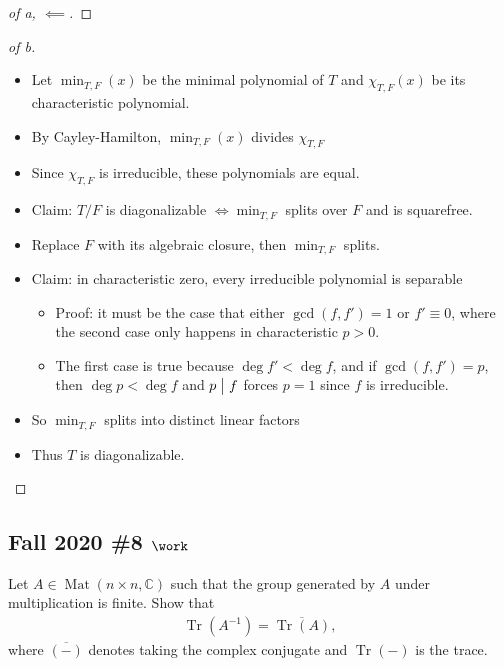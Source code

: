 \begin{solution}
\begin{proof}[of a, $\impliedby$]
\end{proof}

\begin{proof}[of b]

\envlist

\begin{itemize}
\tightlist
\item
  Let \(\min_{T, F}(x)\) be the minimal polynomial of \(T\) and
  \(\chi_{T, F}(x)\) be its characteristic polynomial.
\item
  By Cayley-Hamilton, \(\min_{T, F}(x)\) divides \(\chi_{T, F}\)
\item
  Since \(\chi_{T, F}\) is irreducible, these polynomials are equal.
\item
  Claim: \(T/F\) is diagonalizable \(\iff \min_{T, F}\) splits over
  \(F\) and is squarefree.
\item
  Replace \(F\) with its algebraic closure, then \(\min_{T, F}\) splits.
\item
  Claim: in characteristic zero, every irreducible polynomial is
  separable

  \begin{itemize}
  \tightlist
  \item
    Proof: it must be the case that either \(\gcd(f, f') = 1\) or
    \(f' \equiv 0\), where the second case only happens in
    characteristic \(p>0\).
  \item
    The first case is true because \(\deg f' < \deg f\), and if
    \(\gcd(f, f') = p\), then \(\deg p < \deg f\) and \(p\bigm|f\)
    forces \(p=1\) since \(f\) is irreducible.
  \end{itemize}
\item
  So \(\min_{T, F}\) splits into distinct linear factors
\item
  Thus \(T\) is diagonalizable.
\end{itemize}

\end{proof}

\end{solution}

\hypertarget{fall-2020-8-work}{%
\subsection{\texorpdfstring{Fall 2020 \#8
\(\work\)}{Fall 2020 \#8 \textbackslash work}}\label{fall-2020-8-work}}

Let \(A\in \operatorname{Mat}(n\times n, {\mathbb{C}})\) such that the
group generated by \(A\) under multiplication is finite. Show that
\begin{align*}
\operatorname{Tr}(A^{-1}) ={\overline{{\operatorname{Tr}(A) }}}
,\end{align*}
where \({\overline{{({-})}}}\) denotes taking the complex conjugate and
\(\operatorname{Tr}({-})\) is the trace.

